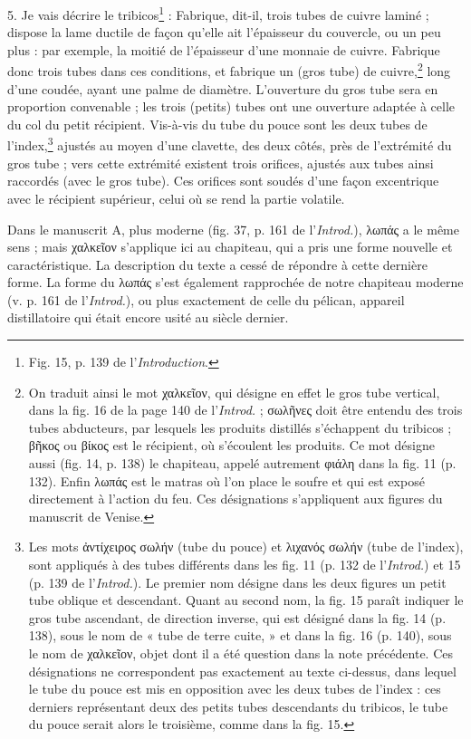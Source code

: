 \documentclass[landscape, a4paper, 11pt, oneside, polutonikogreek, french]{article}
\begin{document}
5. Je vais décrire le tribicos\footnote{Fig. 15, p. 139 de l'\emph{Introduction}.} : Fabrique, dit-il, trois tubes de cuivre laminé ; dispose la lame ductile de façon qu'elle ait l'épaisseur du couvercle, ou un peu plus : par exemple, la moitié de l'épaisseur d'une monnaie de cuivre. Fabrique donc trois tubes dans ces conditions, et fabrique un (gros tube) de cuivre,\footnote{On traduit ainsi le mot χαλκεῖον, qui désigne en effet le gros tube vertical, dans la fig. 16 de la page 140 de l'\emph{Introd.} ; σωλῆνες doit être entendu des trois tubes abducteurs, par lesquels les produits distillés s'échappent du tribicos ; βῆκος ou βίκος est le récipient, où s'écoulent les produits. Ce mot désigne aussi (fig. 14, p. 138) le chapiteau, appelé autrement φιάλη dans la fig. 11 (p. 132). Enfin λωπάς est le matras où l'on place le soufre et qui est exposé directement à l'action du feu. Ces désignations s'appliquent aux figures du manuscrit de Venise.  } long d'une coudée, ayant une palme de diamètre. L'ouverture du gros tube sera en proportion convenable ; les trois (petits) tubes ont une ouverture adaptée à celle du col du petit récipient. Vis-à-vis du tube du pouce sont les deux tubes de l'index,\footnote{Les mots ἀντίχειρος σωλήν (tube du pouce) et λιχανός σωλήν (tube de l'index), sont appliqués à des tubes différents dans les fig. 11 (p. 132 de l'\emph{Introd.}) et 15 (p. 139 de l'\emph{Introd.}). Le premier nom désigne dans les deux figures un petit tube oblique et descendant. Quant au second nom, la fig. 15 paraît indiquer le gros tube ascendant, de direction inverse, qui est désigné dans la fig. 14 (p. 138), sous le nom de « tube de terre cuite, » et dans la fig. 16 (p. 140), sous le nom de χαλκεῖον, objet dont il a été question dans la note précédente. Ces désignations ne correspondent pas exactement au texte ci-dessus, dans lequel le tube du pouce est mis en opposition avec les deux tubes de l'index : ces derniers représentant deux des petits tubes descendants du tribicos, le tube du pouce serait alors le troisième, comme dans la fig. 15.} ajustés au moyen d'une clavette, des deux côtés, près de l'extrémité du gros tube ; vers cette extrémité existent trois orifices, ajustés aux tubes ainsi raccordés (avec le gros tube). Ces orifices sont soudés d'une façon excentrique avec le récipient supérieur, celui où se rend la partie volatile.

Dans le manuscrit A, plus moderne (fig. 37, p. 161 de l'\emph{Introd.}), λωπάς a le même sens ; mais χαλκεῖον s'applique ici au chapiteau, qui a pris une forme nouvelle et caractéristique. La description du texte a cessé de répondre à cette dernière forme. La forme du λωπάς s'est également rapprochée de notre chapiteau moderne (v. p. 161 de l'\emph{Introd.}), ou plus exactement de celle du pélican, appareil distillatoire qui était encore usité au siècle dernier.
\end{document}

